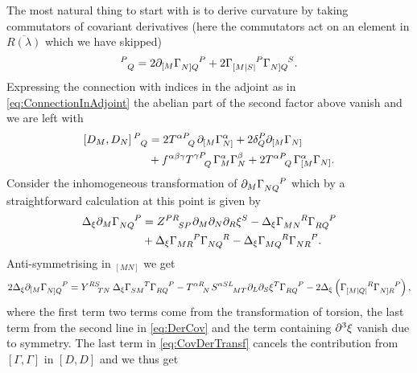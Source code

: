The most natural thing to start with is to derive curvature by taking commutators of covariant derivatives (here the commutators act on an element in $\overbar{R(\lambda)}$ which we have skipped)
\begin{equation}
    [D_M,D_N]\tensor{}{^P_Q} = 2\pd_{[M}\tensor{\Gamma}{_{N]Q}^P}+2\tensor{\Gamma}{_{[M|S|}^P}\tensor{\Gamma}{_{N]Q}^S}.
\end{equation}
Expressing the connection with indices in the adjoint as in \eqref{eq:ConnectionInAdjoint} the abelian part of the second factor above vanish and we are left with 
\begin{equation}
    \begin{aligned}
        \left[D_M,D_N\right]\tensor{}{^P_Q} &= 2\tensor{T}{^{\alpha P}_Q}\pd_{[M}\Gamma_{N]}^\alpha+2\delta^P_Q\pd_{[M}\Gamma_{N]}\\
        &+\tensor{f}{^{\alpha\beta\gamma}}\tensor{T}{^{\gamma P}_Q}\Gamma_M^\alpha\Gamma_N^\beta+2\tensor{T}{^{\alpha P}_Q}\Gamma^\alpha_{[M}\Gamma_{N]}.
    \end{aligned}
\end{equation}
Consider the inhomogeneous transformation of $\pd_M\tensor{\Gamma}{_{NQ}^P}$ which by a straightforward calculation at this point is given by 
\begin{equation}\label{eq:DerCov}
    \begin{aligned}
        \Delta_\xi \pd_M\tensor{\Gamma}{_{NQ}^P} &= \tensor{Z}{^{PR}_{SP}}\pd_M\pd_N\pd_R\xi^S-\Delta_\xi \tensor{\Gamma}{_{MN}^R}\tensor{\Gamma}{_{RQ}^P}\\
        &+\Delta_\xi \tensor{\Gamma}{_{MR}^P}\tensor{\Gamma}{_{NQ}^R}-\Delta_\xi \tensor{\Gamma}{_{MQ}^R}\tensor{\Gamma}{_{NR}^P}.
    \end{aligned}
\end{equation}
Anti-symmetrising in $_{[MN]}$ we get 
\begin{equation}\label{eq:CovDerTransf}
    \begin{aligned}
        2\Delta_\xi\pd_{[M}\tensor{\Gamma}{_{N]Q}^P} = \tensor{Y}{^{RS}_{TN}}\Delta_\xi \tensor{\Gamma}{_{SM}^T}\tensor{\Gamma}{_{RQ}^P}-\tensor{T}{^{\alpha R}_N}\tensor{S}{^{\alpha SL}_{MT}}\pd_L\pd_S\xi^T\tensor{\Gamma}{_{RQ}^P}-2\Delta_\xi\left(\tensor{\Gamma}{_{[M|Q|}^R}\tensor{\Gamma}{_{N]R}^P}\right),
    \end{aligned}
\end{equation}
where the first term two terms come from the transformation of torsion, the last term from the second line in \eqref{eq:DerCov} and the term containing $\partial^3\xi$ vanish due to symmetry. The last term in \eqref{eq:CovDerTransf} cancels the contribution from $[\Gamma,\Gamma]$ in $[D,D]$ and we thus get 
